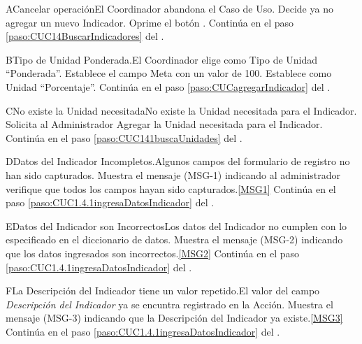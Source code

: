	\begin{UCtrayectoriaA}{A}{Cancelar operación}{El Coordinador abandona el Caso de Uso.}
			\UCpaso[\UCactor] Decide ya no agregar un nuevo Indicador.
			\UCpaso[\UCactor] Oprime el botón .
			\UCpaso Continúa en el paso \ref{paso:CUC14BuscarIndicadores} del .
	\end{UCtrayectoriaA}

	\begin{UCtrayectoriaA}{B}{Tipo de Unidad Ponderada.}{El Coordinador elige como Tipo de Unidad ``Ponderada''.}
			\UCpaso Establece el campo Meta con un valor de 100.
			\UCpaso Establece como Unidad ``Porcentaje''.
			\UCpaso Continúa en el paso \ref{paso:CUCagregarIndicador} del .
	\end{UCtrayectoriaA}


	\begin{UCtrayectoriaA}{C}{No existe la Unidad necesitada}{No existe la Unidad necesitada para el Indicador.}
			\UCpaso [\UCactor] Solicita al Administrador Agregar la Unidad necesitada para el Indicador.
			\UCpaso Continúa en el paso \ref{paso:CUC141buscaUnidades} del .
	\end{UCtrayectoriaA}

	\begin{UCtrayectoriaA}{D}{Datos del Indicador Incompletos.}{Algunos campos del formulario de registro no han sido capturados.}
			\UCpaso Muestra el mensaje (MSG-1) indicando al administrador verifique que todos los campos hayan sido capturados.\ref{MSG1}
			\UCpaso Continúa en el paso \ref{paso:CUC1.4.1ingresaDatosIndicador} del .
	\end{UCtrayectoriaA}

	\begin{UCtrayectoriaA}{E}{Datos del Indicador son Incorrectos}{Los datos del Indicador no cumplen con lo especificado en el diccionario de datos.}
			\UCpaso Muestra el mensaje (MSG-2) indicando que los datos ingresados son incorrectos.\ref{MSG2}
			\UCpaso Continúa en el paso \ref{paso:CUC1.4.1ingresaDatosIndicador} del .
	\end{UCtrayectoriaA}

	\begin{UCtrayectoriaA}{F}{La Descripción del Indicador tiene un valor repetido.}{El valor del campo \textit{Descripción del Indicador} ya se encuntra registrado en la Acción.}
		\UCpaso Muestra el mensaje (MSG-3) indicando que la Descripción del Indicador ya existe.\ref{MSG3}
			\UCpaso Continúa en el paso \ref{paso:CUC1.4.1ingresaDatosIndicador} del .
	\end{UCtrayectoriaA}

